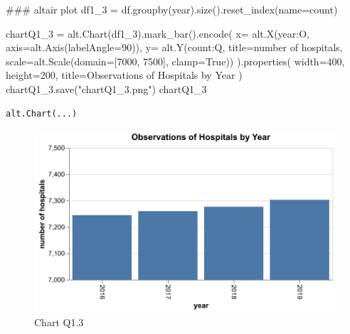 \documentclass[
  letterpaper,
  DIV=11,
  numbers=noendperiod]{scrartcl}
\newenvironment{Shaded}{\begin{snugshade}}{\end{snugshade}}
\newcommand{\CommentTok}[1]{\textcolor[rgb]{0.37,0.37,0.37}{#1}}
\newcommand{\DecValTok}[1]{\textcolor[rgb]{0.68,0.00,0.00}{#1}}
\newcommand{\NormalTok}[1]{\textcolor[rgb]{0.00,0.23,0.31}{#1}}
\newcommand{\OperatorTok}[1]{\textcolor[rgb]{0.37,0.37,0.37}{#1}}
\newcommand{\StringTok}[1]{\textcolor[rgb]{0.13,0.47,0.30}{#1}}
\newcommand{\VariableTok}[1]{\textcolor[rgb]{0.07,0.07,0.07}{#1}}
\begin{document}
\begin{Shaded}
\begin{Highlighting}[]
\CommentTok{\#\#\# altair plot}
\NormalTok{df1\_3 }\OperatorTok{=}\NormalTok{ df.groupby(}\StringTok{\textquotesingle{}year\textquotesingle{}}\NormalTok{).size().reset\_index(name}\OperatorTok{=}\StringTok{\textquotesingle{}count\textquotesingle{}}\NormalTok{)}

\NormalTok{chartQ1\_3 }\OperatorTok{=}\NormalTok{ alt.Chart(df1\_3).mark\_bar().encode(}
\NormalTok{    x}\OperatorTok{=}\NormalTok{ alt.X(}\StringTok{\textquotesingle{}year:O\textquotesingle{}}\NormalTok{, axis}\OperatorTok{=}\NormalTok{alt.Axis(labelAngle}\OperatorTok{=}\DecValTok{90}\NormalTok{)),}
\NormalTok{    y}\OperatorTok{=}\NormalTok{ alt.Y(}\StringTok{\textquotesingle{}count:Q\textquotesingle{}}\NormalTok{, title}\OperatorTok{=}\StringTok{\textquotesingle{}number of hospitals\textquotesingle{}}\NormalTok{, scale}\OperatorTok{=}\NormalTok{alt.Scale(domain}\OperatorTok{=}\NormalTok{[}\DecValTok{7000}\NormalTok{, }\DecValTok{7500}\NormalTok{], clamp}\OperatorTok{=}\VariableTok{True}\NormalTok{))}
\NormalTok{).properties(}
\NormalTok{    width}\OperatorTok{=}\DecValTok{400}\NormalTok{, }
\NormalTok{    height}\OperatorTok{=}\DecValTok{200}\NormalTok{, }
\NormalTok{    title}\OperatorTok{=}\StringTok{\textquotesingle{}Observations of Hospitals by Year\textquotesingle{}}  
\NormalTok{)}
\NormalTok{chartQ1\_3.save(}\StringTok{"chartQ1\_3.png"}\NormalTok{)}
\NormalTok{chartQ1\_3}
\end{Highlighting}
\end{Shaded}

\begin{verbatim}
alt.Chart(...)
\end{verbatim}

\begin{figure}[H]

{\centering \includegraphics{chartQ1_3.png}

}

\caption{Chart Q1.3}

\end{figure}%
\end{document}
